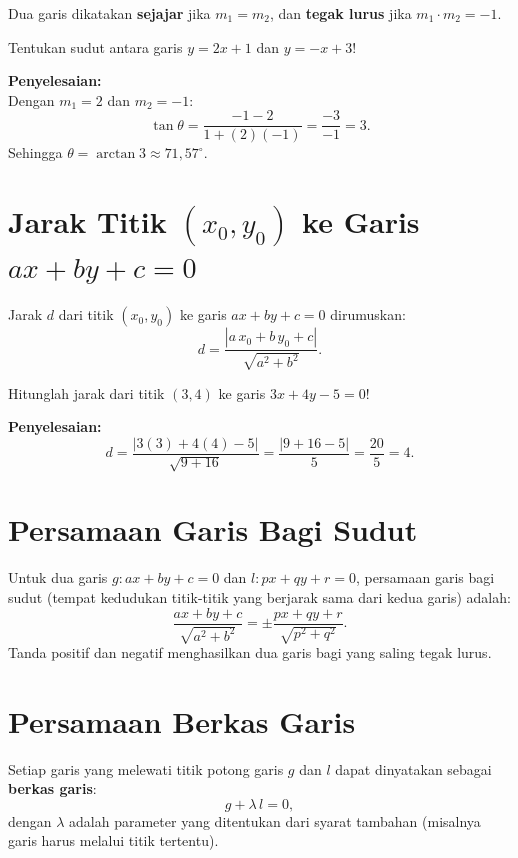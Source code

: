 Dua garis dikatakan \textbf{sejajar} jika $m_1 = m_2$, dan \textbf{tegak lurus} jika $m_1 \cdot m_2 = -1$.

\begin{exmp}
Tentukan sudut antara garis $y = 2x + 1$ dan $y = -x + 3$!

\textbf{Penyelesaian:}\\
Dengan $m_1 = 2$ dan $m_2 = -1$:
\[
\tan\theta = \frac{-1 - 2}{1 + (2)(-1)} = \frac{-3}{-1} = 3.
\]
Sehingga $\theta = \arctan 3 \approx 71{,}57^\circ$.
\end{exmp}

\section{Jarak Titik $(x_0, y_0)$ ke Garis $ax+by+c=0$}

Jarak $d$ dari titik $(x_0, y_0)$ ke garis $ax+by+c=0$ dirumuskan:
\begin{equation}
    d = \frac{|a\,x_0+b\,y_0+c|}{\sqrt{a^2+b^2}}.
\end{equation}

\begin{exmp}
Hitunglah jarak dari titik $(3, 4)$ ke garis $3x + 4y - 5 = 0$!

\textbf{Penyelesaian:}\\
\[
d = \frac{|3(3) + 4(4) - 5|}{\sqrt{9 + 16}} = \frac{|9 + 16 - 5|}{5} = \frac{20}{5} = 4.
\]
\end{exmp}

\section{Persamaan Garis Bagi Sudut}

Untuk dua garis $g: ax + by + c = 0$ dan $l: px + qy + r = 0$, persamaan garis bagi sudut (tempat kedudukan titik-titik yang berjarak sama dari kedua garis) adalah:
\begin{equation}
    \frac{ax+by+c}{\sqrt{a^2+b^2}} = \pm\frac{px+qy+r}{\sqrt{p^2+q^2}}.
\end{equation}
Tanda positif dan negatif menghasilkan dua garis bagi yang saling tegak lurus.

\section{Persamaan Berkas Garis}

Setiap garis yang melewati titik potong garis $g$ dan $l$ dapat dinyatakan sebagai \textbf{berkas garis}:
\begin{equation}
    g + \lambda\,l = 0,
\end{equation}
dengan $\lambda$ adalah parameter yang ditentukan dari syarat tambahan (misalnya garis harus melalui titik tertentu).

